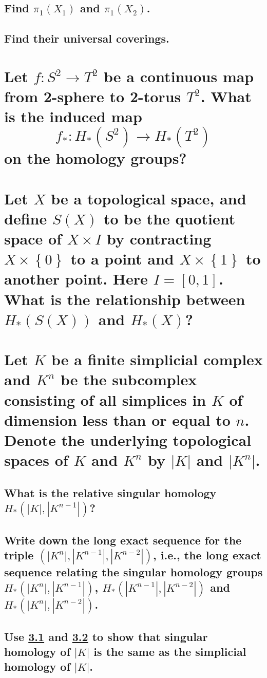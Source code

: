 \documentclass[10pt]{article}
\begin{document}
\subsection{Find $\pi_1(X_1)$ and $\pi_1(X_2)$.}

\subsection{Find their universal coverings.}

\section{Let $f: S^2 \to T^2$ be a continuous map from 2-sphere to 2-torus $T^2$. What is the
  induced map 
  $$f_* : H_*(S^2) \to H_*(T^2)$$
  on the homology groups?}

\section{Let $X$ be a topological space, and define $S(X)$ to be the quotient space of $X\times I$
  by contracting $X \times \left\{ 0 \right\} $ to a point and $X \times \left\{ 1 \right\} $ to
  another point. Here $I = [0,1]$. What is the relationship between $H_*(S(X))$ and $H_*(X)$?}

\section{Let $K$ be a finite simplicial complex and $K^n$ be the subcomplex consisting of all
  simplices in $K$ of dimension less than or equal to $n$. Denote the underlying topological spaces
  of $K$ and $K^n$ by $|K|$ and $|K^n|$.}

\subsection{What is the relative singular homology $H_*(|K|, |K^{n-1}|)$?}
\label{former}

\subsection{Write down the long exact sequence for the triple $(|K^n|, |K^{n-1}|, |K^{n-2}|)$, i.e.,
  the long exact sequence relating the singular homology groups $H_*(|K^n|, |K^{n-1}|)$,
  $H_*(|K^{n-1}|, |K^{n-2}|)$ and  $H_*(|K^n|, |K^{n-2}|)$.}
\label{latter}

\subsection{Use \ref{former}  and \ref{latter} to show that singular homology of $|K|$ is the same as the simplicial homology
  of $|K|$. }
\end{document}

